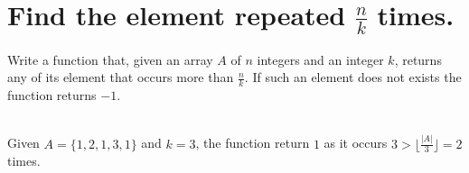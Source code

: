 %



\section{Find the element repeated $\frac{n}{k}$ times.}
\label{ch:find_repeated_number_n_divided_3_times}

\begin{exercise}
\label{example:find_repeated_number_n_divided_3_times:exercice1}
Write a function that, given an array $A$ of $n$ integers and an integer $k$,
returns any of its element that occurs more than  $\frac{n}{k}$.
If such an element does not exists the function returns $-1$.


	\begin{example}
		\label{example:find_repeated_number_n_divided_3_times:example1}
		\hfill \\
		Given $A=\{1,2,1,3,1\}$ and $k=3$, the function return $1$ as it occurs $3 > \Big\lfloor\frac{|A|}{3}\Big\rfloor =2$ times.
	\end{example}

\end{exercise}



